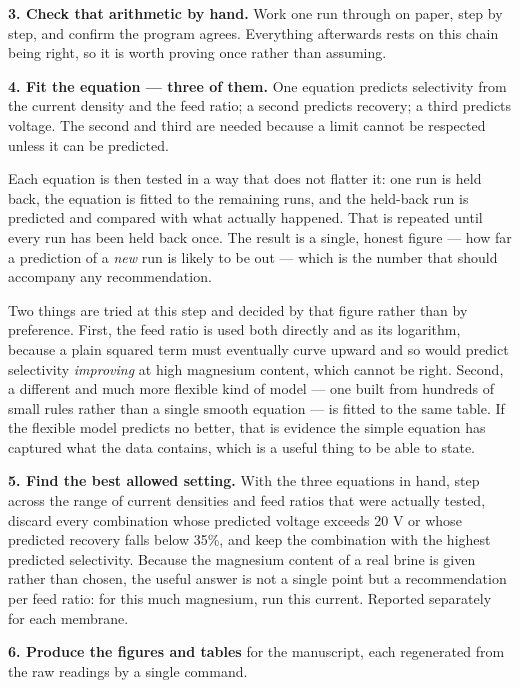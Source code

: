 \documentclass[11pt,a4paper]{article}
\begin{document}
\textbf{3. Check that arithmetic by hand.} Work one run through on paper, step by step, and
confirm the program agrees. Everything afterwards rests on this chain being right, so it is worth
proving once rather than assuming.

\textbf{4. Fit the equation --- three of them.} One equation predicts selectivity from the
current density and the feed ratio; a second predicts recovery; a third predicts voltage. The
second and third are needed because a limit cannot be respected unless it can be predicted.

Each equation is then tested in a way that does not flatter it: one run is held back, the
equation is fitted to the remaining runs, and the held-back run is predicted and compared with
what actually happened. That is repeated until every run has been held back once. The result is a
single, honest figure --- how far a prediction of a \emph{new} run is likely to be out --- which
is the number that should accompany any recommendation.

Two things are tried at this step and decided by that figure rather than by preference. First,
the feed ratio is used both directly and as its logarithm, because a plain squared term must
eventually curve upward and so would predict selectivity \emph{improving} at high magnesium
content, which cannot be right. Second, a different and much more flexible kind of model --- one
built from hundreds of small rules rather than a single smooth equation --- is fitted to the same
table. If the flexible model predicts no better, that is evidence the simple equation has
captured what the data contains, which is a useful thing to be able to state.

\textbf{5. Find the best allowed setting.} With the three equations in hand, step across the
range of current densities and feed ratios that were actually tested, discard every combination
whose predicted voltage exceeds 20 V or whose predicted recovery falls below 35\%, and keep the
combination with the highest predicted selectivity. Because the magnesium content of a real
brine is given rather than chosen, the useful answer is not a single point but a recommendation
per feed ratio: for this much magnesium, run this current. Reported separately for each membrane.

\textbf{6. Produce the figures and tables} for the manuscript, each regenerated from the raw
readings by a single command.
\end{document}

